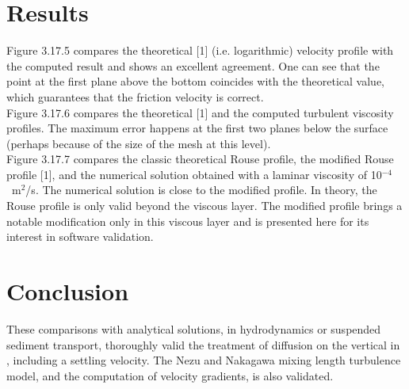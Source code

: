 \section{Results}
%
Figure 3.17.5 compares the theoretical [1] (i.e. logarithmic) velocity
profile with the computed result and shows an excellent agreement.
One can see that the point at the first plane above the bottom coincides
with the theoretical value, which guarantees that the friction velocity
is correct.\\
Figure 3.17.6 compares the theoretical [1] and the computed turbulent
viscosity profiles.
The maximum error happens at the first two planes below the surface
(perhaps because of the size of the mesh at this level).\\
Figure 3.17.7 compares the classic theoretical Rouse profile, the
modified Rouse profile [1], and the numerical solution obtained with a
laminar viscosity of 10$^{-4}$~m$^2$/s.
The numerical solution is close to the modified profile.
In theory, the Rouse profile is only valid beyond the viscous layer.
The modified profile brings a notable modification only in this viscous
layer and is presented here for its interest in software validation.
%
\section{Conclusion}
%
These comparisons with analytical solutions, in hydrodynamics or
suspended sediment transport, thoroughly valid the treatment of
diffusion on the vertical in , including a settling
 velocity.
The Nezu and Nakagawa mixing length turbulence model, and the
computation of velocity gradients, is also validated.
%
%
